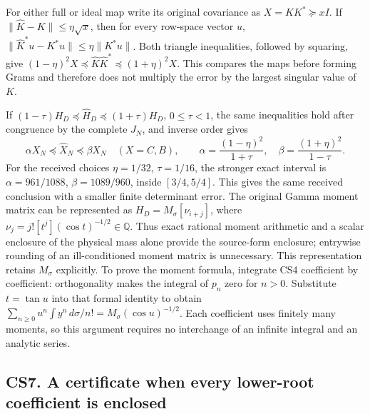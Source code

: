 \documentclass[11pt]{article}
\begin{document}
For either full or ideal map write its original covariance as \(X=KK^*\succeq xI\). If \(\|\widehat K-K\|\le\eta\sqrt x\), then for every row-space vector \(u\), \(\|\widehat K^*u-K^*u\|\le\eta\|K^*u\|\). Both triangle inequalities, followed by squaring, give \((1-\eta)^2X\preceq\widehat K\widehat K^*\preceq(1+\eta)^2X\). This compares the maps before forming Grams and therefore does not multiply the error by the largest singular value of \(K\).

If \((1-\tau)H_D\preceq\widehat H_D\preceq(1+\tau)H_D\), \(0\le\tau<1\), the same inequalities hold after congruence by the complete \(J_N\), and inverse order gives \[
 \boxed{\alpha X_N\preceq\widehat X_N\preceq\beta X_N\quad(X=C,B),\qquad
 \alpha=\frac{(1-\eta)^2}{1+\tau},\quad\beta=\frac{(1+\eta)^2}{1-\tau}.}
 \tag{CS20}
\] For the received choices \(\eta=1/32\), \(\tau=1/16\), the stronger exact interval is \(\alpha=961/1088\), \(\beta=1089/960\), inside \([3/4,5/4]\). This gives the same received conclusion with a smaller finite determinant error. The original Gamma moment matrix can be represented as \(H_D=M_\sigma[\nu_{i+j}]\), where \(\nu_j=j![t^j](\cos t)^{-1/2}\in\mathbb Q\). Thus exact rational moment arithmetic and a scalar enclosure of the physical mass alone provide the source-form enclosure; entrywise rounding of an ill-conditioned moment matrix is unnecessary. This representation retains \(M_\sigma\) explicitly. To prove the moment formula, integrate CS4 coefficient by coefficient: orthogonality makes the integral of \(p_n\) zero for \(n>0\). Substitute \(t=\tan u\) into that formal identity to obtain \(\sum_{n\ge0}u^n\int y^n\,d\sigma/n!=M_\sigma(\cos u)^{-1/2}\). Each coefficient uses finitely many moments, so this argument requires no interchange of an infinite integral and an analytic series.

\subsection{CS7. A certificate when every lower-root coefficient is enclosed}\label{cs7.-a-certificate-when-every-lower-root-coefficient-is-enclosed}
\end{document}
